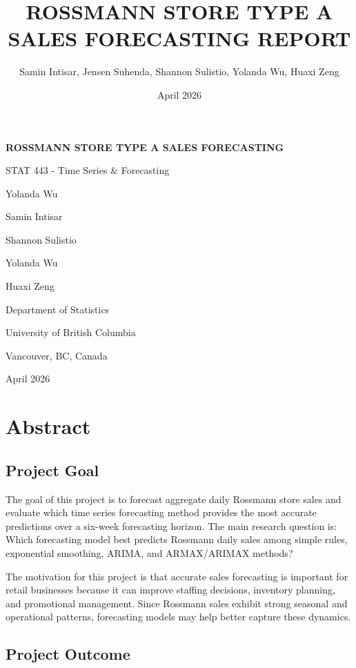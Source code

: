 \documentclass[
  12pt,
]{article}
\title{ROSSMANN STORE TYPE A SALES FORECASTING REPORT}
\author{Samin Intisar, Jensen Suhenda, Shannon Sulistio, Yolanda Wu,
Huaxi Zeng}
\date{April 2026}
\begin{document}
\maketitle

\begin{titlepage}
\centering
\vspace*{2.5cm}
{\LARGE \bfseries ROSSMANN STORE TYPE A SALES FORECASTING \par}
\vspace{2cm}
{\Large STAT 443 - Time Series \& Forecasting \par}
\vspace{1.5cm}
{\large
Yolanda Wu\par
Samin Intisar\par
Shannon Sulistio\par
Yolanda Wu\par
Huaxi Zeng\par
}
\vfill
{\large Department of Statistics\par
University of British Columbia\par
Vancouver, BC, Canada\par
April 2026\par}
\end{titlepage}
\tableofcontents
\newpage

\section{Abstract}\label{abstract}

\subsection{Project Goal}\label{project-goal}

The goal of this project is to forecast aggregate daily Rossmann store
sales and evaluate which time series forecasting method provides the
most accurate predictions over a six-week forecasting horizon. The main
research question is: Which forecasting model best predicts Rossmann
daily sales among simple rules, exponential smoothing, ARIMA, and
ARMAX/ARIMAX methods?

The motivation for this project is that accurate sales forecasting is
important for retail businesses because it can improve staffing
decisions, inventory planning, and promotional management. Since
Rossmann sales exhibit strong seasonal and operational patterns,
forecasting models may help better capture these dynamics.

\subsection{Project Outcome}\label{project-outcome}
\end{document}
